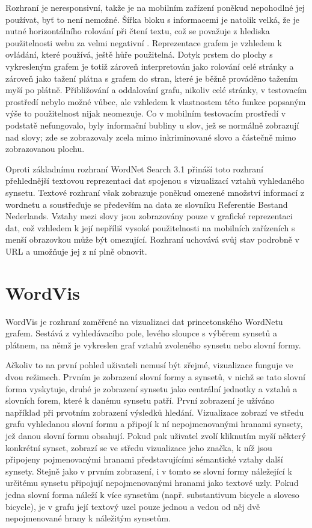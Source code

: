 \documentclass[a4paper, 11pt, oneside]{book}
\newcommand\ex{\textsf}
\begin{document}
				Rozhraní je neresponsivní, takže je na mobilním zařízení poněkud nepohodlné jej používat, byť to není nemožné. Šířka bloku s informacemi je natolik velká, že je nutné horizontálního rolování při čtení textu, což se považuje z hlediska použitelnosti webu za velmi negativní \parencite{nn2005scrollbar, richards2004web}. Reprezentace grafem je vzhledem k ovládání, které používá, ještě hůře použitelná. Dotyk prstem do plochy s vykresleným grafem je totiž zároveň interpretován jako rolování celé stránky a zároveň jako tažení plátna s grafem do stran, které je běžně prováděno tažením myší po plátně. Přibližování a oddalování grafu, nikoliv celé stránky, v testovacím prostředí nebylo možné vůbec, ale vzhledem k vlastnostem této funkce popsaným výše to použitelnost nijak neomezuje. Co v mobilním testovacím prostředí v podstatě nefungovalo, byly informační bubliny u slov, jež se normálně zobrazují nad slovy; zde se zobrazovaly zcela mimo inkriminované slovo a částečně mimo zobrazovanou plochu.

				Oproti základnímu rozhraní WordNet Search 3.1 přináší toto rozhraní přehlednější textovou reprezentaci dat spojenou s vizualizací vztahů vyhledaného synsetu. Textové rozhraní však zobrazuje poněkud omezené množství informací z wordnetu a soustřeďuje se především na data ze slovníku Referentie Bestand Nederlands. Vztahy mezi slovy jsou zobrazovány pouze v grafické reprezentaci dat, což vzhledem k její nepříliš vysoké použitelnosti na mobilních zařízeních s menší obrazovkou může být omezující. Rozhraní uchovává svůj stav podrobně v URL a umožňuje jej z ní plně obnovit.


			\section{WordVis}
			\label{vis:wordvis}

				WordVis je rozhraní zaměřené na vizualizaci dat princetonského WordNetu grafem. Sestává z vyhledávacího pole, levého sloupce s výběrem synsetů a plátnem, na němž je vykreslen graf vztahů zvoleného synsetu nebo slovní formy. 

				Ačkoliv to na první pohled uživateli nemusí být zřejmé, vizualizace funguje ve dvou režimech. Prvním je zobrazení slovní formy a synsetů, v nichž se tato slovní forma vyskytuje, druhé je zobrazení synsetu jako centrální jednotky a vztahů a slovních forem, které k danému synsetu patří. První zobrazení je užíváno například při prvotním zobrazení výsledků hledání. Vizualizace zobrazí ve středu grafu vyhledanou slovní formu a připojí k ní nepojmenovanými hranami synsety, jež danou slovní formu obsahují. Pokud pak uživatel zvolí kliknutím myší některý konkrétní synset, zobrazí se ve středu vizualizace jeho značka, k níž jsou připojeny pojmenovanými hranami představujícími sémantické vztahy další synsety. Stejně jako v prvním zobrazení, i v tomto se slovní formy náležející k určitému synsetu připojují nepojmenovanými hranami jako textové uzly. Pokud jedna slovní forma náleží k více synsetům (např. substantivum \ex{bicycle} a sloveso \ex{bicycle}), je v grafu její textový uzel pouze jednou a vedou od něj dvě nepojmenované hrany k náležitým synsetům. 
\end{document}
